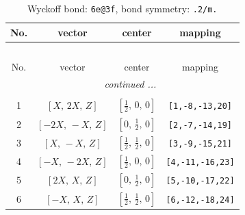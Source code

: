 \documentclass[fleqn,8pt]{jsarticle}
\begin{document}
\begin{longtable}{cccc}
\caption{Wyckoff bond: {\tt 6e@3f}, bond symmetry: {\tt .2/m.}}
 \\
 \hline \hline
No. & vector & center & mapping \\ \hline \endfirsthead

\multicolumn{3}{l}{\tablename\ \thetable{}} \\
 \hline \hline
No. & vector & center & mapping \\ \hline \endhead

 \hline \hline
\multicolumn{3}{r}{\footnotesize\it continued ...} \\ \endfoot

 \hline \hline
\multicolumn{3}{r}{} \\ \endlastfoot

1 & $\left[ X,\, 2 X,\, Z \right]$ & $\left[ \frac{1}{2},\, 0,\, 0 \right]$ & {\tt [1,-8,-13,20]} \\ \hline
2 & $\left[ - 2 X,\, - X,\, Z \right]$ & $\left[ 0,\, \frac{1}{2},\, 0 \right]$ & {\tt [2,-7,-14,19]} \\ \hline
3 & $\left[ X,\, - X,\, Z \right]$ & $\left[ \frac{1}{2},\, \frac{1}{2},\, 0 \right]$ & {\tt [3,-9,-15,21]} \\ \hline
4 & $\left[ - X,\, - 2 X,\, Z \right]$ & $\left[ \frac{1}{2},\, 0,\, 0 \right]$ & {\tt [4,-11,-16,23]} \\ \hline
5 & $\left[ 2 X,\, X,\, Z \right]$ & $\left[ 0,\, \frac{1}{2},\, 0 \right]$ & {\tt [5,-10,-17,22]} \\ \hline
6 & $\left[ - X,\, X,\, Z \right]$ & $\left[ \frac{1}{2},\, \frac{1}{2},\, 0 \right]$ & {\tt [6,-12,-18,24]} \\
\end{longtable}
\renewcommand{\arraystretch}{1.2}
\end{document}
